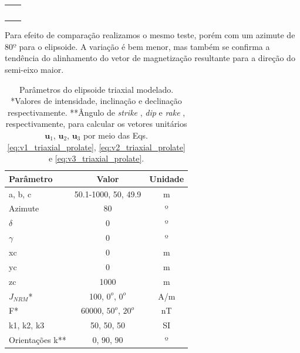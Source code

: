 \begin{table}[h!]
	\begin{center}
		\begin{tabular}{lc}
			
			& \\
			& \\
			& \\
			& \\
			& \\
			
		\end{tabular}
	\end{center}
\end{table}

Para efeito de comparação realizamos o mesmo teste, porém com um azimute de 80$º$ para o elipsoide. A variação é bem menor, mas também se confirma a tendência do alinhamento do vetor de magnetização resultante para a direção do semi-eixo maior.

\vspace{2cm}

\begin{table}[h!]
	\begin{center}
		\begin{tabular}{|l|c|c|}
			\hline
			\textbf{Parâmetro}  & \textbf{Valor}  & \textbf{Unidade} \\
			\hline 
			a, b, c & 50.1-1000, 50, 49.9 & m\\
			\hline
			Azimute   & $80$ & º\\
			\hline
			$\delta$    & $0$ & º\\
			\hline
			$\gamma$   & $0$  & º\\
			\hline
			xc   & 0  & m\\
			\hline          
			yc   & 0  & m\\
			\hline                
			zc   & 1000  & m\\
			\hline
			$J_{NRM}$*  & 100, $0^o$, $0^o$  & A/m\\
			\hline
			F*    & 60000, $50^o$, $20^o$ & nT\\
			\hline
			k1, k2, k3   & 50, 50, 50  & SI\\
			\hline
			Orientações k**   & $0$, $90$, $90$  & º\\
			\hline
		\end{tabular}
		\caption{Parâmetros do elipsoide triaxial modelado. *Valores de intensidade, inclinação e declinação respectivamente. **Ângulo de \textit{strike} , \textit{dip}  e \textit{rake} , respectivamente, para calcular os vetores unitários $\mathbf{u}_{1}$, $\mathbf{u}_{2}$, $\mathbf{u}_{3}$ por meio das Eqs. \ref{eq:v1_triaxial_prolate}, \ref{eq:v2_triaxial_prolate} e \ref{eq:v3_triaxial_prolate}.}
	\end{center}
	\label{tab:ellipsoid_shape_iso80}
\end{table}

